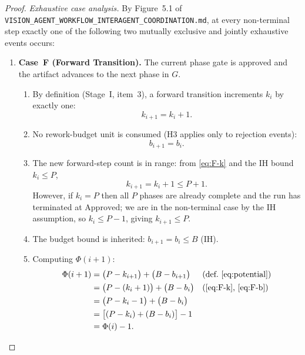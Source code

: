 \documentclass[12pt]{article}
\theoremstyle{definition}
\newcommand{\code}[1]{\texttt{#1}}
\newcommand{\VisionFlow}{\code{VISION\_AGENT\_\allowbreak WORKFLOW\_\allowbreak INTERAGENT\_\allowbreak COORDINATION.md}}
\begin{document}
\begin{proof}
\medskip
\noindent\textit{Exhaustive case analysis.}
By Figure~5.1 of \VisionFlow{}, at every non-terminal step exactly one of the
following two mutually exclusive and jointly exhaustive events occurs:

\begin{enumerate}
  \item \textbf{Case~F (Forward Transition).}
        The current phase gate is approved and the artifact advances
        to the next phase in $G$.
        \begin{enumerate}
          \item By definition (Stage~I, item~3), a forward transition
                increments $k_i$ by exactly one:
                \begin{equation}
                  \label{eq:F-k}
                  k_{i+1} = k_i + 1.
                \end{equation}
          \item No rework-budget unit is consumed (H3 applies only to
                rejection events):
                \begin{equation}
                  \label{eq:F-b}
                  b_{i+1} = b_i.
                \end{equation}
          \item The new forward-step count is in range: from
                \eqref{eq:F-k} and the IH bound $k_i \leq P$,
                \begin{equation}
                  \label{eq:F-k-bound}
                  k_{i+1} = k_i + 1 \leq P + 1.
                \end{equation}
                However, if $k_i = P$ then all $P$ phases are already
                complete and the run has terminated at
                $\mathrm{Approved}$; we are in the non-terminal case by
                the IH assumption, so $k_i \leq P - 1$, giving
                $k_{i+1} \leq P$.
          \item The budget bound is inherited: $b_{i+1} = b_i \leq B$
                (IH).
          \item Computing $\Phi(i+1)$:
                \begin{align}
                  \Phi(i+1)
                    &= \bigl(P - k_{i+1}\bigr) + \bigl(B - b_{i+1}\bigr)
                       && \text{(def.\ \eqref{eq:potential})} \notag\\
                    &= \bigl(P - (k_i+1)\bigr) + \bigl(B - b_i\bigr)
                       && \text{(\eqref{eq:F-k}, \eqref{eq:F-b})} \notag\\
                    &= \bigl(P - k_i - 1\bigr) + \bigl(B - b_i\bigr)
                       \notag\\
                    &= \bigl[(P - k_i) + (B - b_i)\bigr] - 1
                       \notag\\
                    &= \Phi(i) - 1.
                       \label{eq:F-result}
                \end{align}
        \end{enumerate}


\end{enumerate}
\end{proof}
\end{document}
